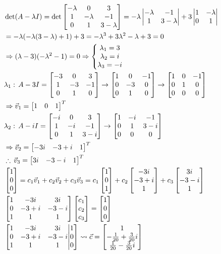\documentclass[11pt, fleqn]{article}
\begin{document}
\begin{align*}
    &\det(A-\lambda I)=\det\matrixx{-\lambda&0&3\\1&-\lambda&-1\\0&1&3-\lambda}=-\lambda\detmatrix{-\lambda&-1\\1&3-\lambda}+3\detmatrix{1&-\lambda\\0&1}\\
    &=-\lambda(-\lambda(3-\lambda)+1)+3=-\lambda^3+3\lambda^2-\lambda+3=0\\
    &\Ra (\lambda-3)(-\lambda^2-1)=0\Ra \eqnsystem{\lambda_1=3\\\lambda_2=i\\\lambda_3=-i}\\
    &\lambda_1:\,A-3I=\matrixx{-3&0&3\\1&-3&-1\\0&1&0}\to\matrixx{1&0&-1\\0&-3&0\\0&1&0}\to\matrixx{1&0&-1\\0&1&0\\0&0&0}\\
    &\Ra \vec{v}_1=\matrixx{1&0&1}^T\\
    &\lambda_2:\,A-iI=\matrixx{-i&0&3\\1&-i&-1\\0&1&3-i}\to\matrixx{1&-i&-1\\0&1&3-i\\0&0&0}\\
    &\Ra \vec{v}_2=\matrixx{-3i&-3+i&1}^T\\
    &\therefore\,\vec{v}_3=\matrixx{3i&-3-i&1}^T\\
    &\matrixx{1\\0\\0}=c_1\vec{v}_1+c_2\vec{v}_2+c_3\vec{v}_3=c_1\matrixx{1\\0\\1}+c_2\matrixx{-3i\\-3+i\\1}+c_3\matrixx{3i\\-3-i\\1}\\
    &\matrixx{1&-3i&3i\\0&-3+i&-3-i\\1&1&1}\matrixx{c_1\\c_2\\c_3}=\matrixx{1\\0\\0}\\
    &\augmatrix{1&-3i&3i\\0&-3+i&-3-i\\1&1&1}{1\\0\\0}\leadsto\vec{c}=\matrixx{1\\-\frac{1}{20}+\frac{3}{20}i\\\-\frac{1}{20}-\frac{3}{20}i}\\

\end{align*}
\end{document}
